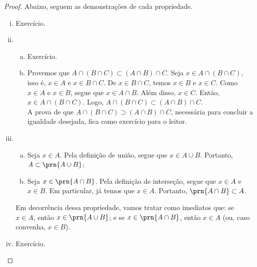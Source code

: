 \begin{proof}
Abaixo, seguem as demonstrações de cada propriedade.
\begin{enumerate}[i)]
    \item Exercício.

    \item
        \begin{enumerate}[a)]
            \item Exercício.
            \item
                Provemos que $A \cap (B \cap C) \subset (A \cap B) \cap C$. Seja $x \in A \cap (B \cap C)$, isso é, $x \in A$ e $x \in B \cap C$. De $x \in B \cap C$, temos $x \in B$ e $x \in C$. Como $x \in A$ e $x \in B$, segue que $x \in A \cap B$. Além disso, $x \in C$. Então, $x \in A \cap (B \cap C)$. Logo, $A \cap (B \cap C) \subset (A \cap B) \cap C$. \\
                A prova de que $A \cap (B \cap C) \supset (A \cap B) \cap C$, necessária para concluir a igualdade desejada, fica como exercício para o leitor.
        \end{enumerate}

    \item 	
        \begin{enumerate}[a)]
            \item
                Seja $x \in A$. Pela definição de união, segue que $x \in A \cup B$. Portanto, $A \subset \prn{A \cup B}$;
            \item
                Seja $x \in \prn{A \cap B}$. Pela definição de interseção, segue que $x\in A$ e $x \in B$. Em particular, já temos que $x \in A$. Portanto, $\prn{A \cap B} \subset A$.
        \end{enumerate}
        Em decorrência dessa propriedade, vamos tratar como imediatos que: se $x \in A$, então $x \in \prn{A \cup B}$; e se $x \in \prn{A \cap B}$, então $x\in A$ (ou, caso convenha, $x\in B$).

    \item Exercício.


\end{enumerate}
\end{proof}
